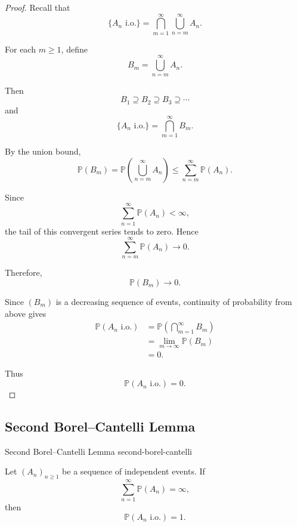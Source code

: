 \begin{proof}

Recall that
\[
\{A_n\text{ i.o.}\}
=
\bigcap_{m=1}^{\infty}
\bigcup_{n=m}^{\infty}A_n.
\]

For each $m\geq1$, define
\[
B_m
=
\bigcup_{n=m}^{\infty}A_n.
\]

Then
\[
B_1\supseteq B_2\supseteq B_3\supseteq\cdots
\]
and
\[
\{A_n\text{ i.o.}\}
=
\bigcap_{m=1}^{\infty}B_m.
\]

By the union bound,
\[
\mathbb{P}(B_m)
=
\mathbb{P}
\left(
\bigcup_{n=m}^{\infty}A_n
\right)
\leq
\sum_{n=m}^{\infty}\mathbb{P}(A_n).
\]

Since
\[
\sum_{n=1}^{\infty}\mathbb{P}(A_n)<\infty,
\]
the tail of this convergent series tends to zero. Hence
\[
\sum_{n=m}^{\infty}\mathbb{P}(A_n)
\longrightarrow0.
\]

Therefore,
\[
\mathbb{P}(B_m)\longrightarrow0.
\]

Since $(B_m)$ is a decreasing sequence of events, continuity of
probability from above gives
\[
\begin{aligned}
\mathbb{P}(A_n\text{ i.o.})
&=
\mathbb{P}
\left(
\bigcap_{m=1}^{\infty}B_m
\right)\\
&=
\lim_{m\to\infty}\mathbb{P}(B_m)\\
&=0.
\end{aligned}
\]

Thus
\[
\boxed{
\mathbb{P}(A_n\text{ i.o.})=0.
}
\]

\end{proof}



\subsection{Second Borel--Cantelli Lemma}

\begin{theorem}{Second Borel--Cantelli Lemma}
{second-borel-cantelli}

Let $(A_n)_{n\geq1}$ be a sequence of independent events. If
\[
\sum_{n=1}^{\infty}\mathbb{P}(A_n)=\infty,
\]
then
\[
\boxed{
\mathbb{P}(A_n\text{ i.o.})=1.
}
\]

\end{theorem}


